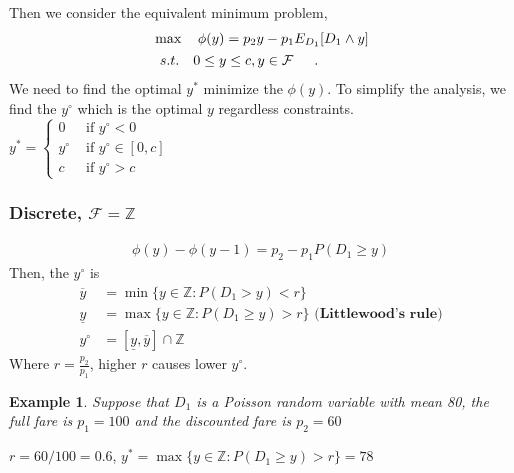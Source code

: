 \documentclass[11pt,a4paper]{article}
\newtheorem{example}{Example}
\begin{document}
Then we consider the equivalent minimum problem,
\begin{align*}
    &\max\quad \phi(y)=p_2y-p_1E_{D_1}[D_1\wedge y]\\
    &\begin{array}{r@{\quad}r@{}l@{\quad}l}
    s.t.
    &0\leq y\leq c&,y\in \mathcal{F} &\\
\end{array} .
\end{align*}
We need to find the optimal $y^*$ minimize the $\phi(y)$. To simplify the analysis, we find the $y^\circ$ which is the optimal $y$ regardless constraints. $y^*=\left\{\begin{matrix}
    0& \text{ if }y^\circ<0\\
    y^\circ&\text{ if }y^\circ\in[0,c]\\
    c&\text{ if }y^\circ>c
\end{matrix}\right.$
\subsubsection{Discrete, $\mathcal{F}=\mathbb{Z}$}
\begin{equation}
    \begin{aligned}
        \phi(y)-\phi(y-1)=p_2-p_1P(D_1\geq y)
    \end{aligned}
    \nonumber
\end{equation}
Then, the $y^\circ$ is
\begin{equation}
    \begin{aligned}
        \overline{y}&=\min\{y\in \mathbb{Z}: P(D_1>y)<r\}\\
        \underline{y}&=\max\{y\in \mathbb{Z}: P(D_1\geq y)>r\} \textbf{ (Littlewood's rule)}\\
        y^\circ&=[\underline{y},\overline{y}]\cap \mathbb{Z}
    \end{aligned}
    \nonumber
\end{equation}
Where $r=\frac{p_2}{p_1}$, higher $r$ causes lower $y^\circ$.

\begin{example}
    Suppose that $D_1$ is a Poisson random variable with mean 80, the full fare is $p_1 = 100$ and the discounted fare is $p_2 = 60$
\end{example}
$r=60/100=0.6$, $y^*=\max\{y\in \mathbb{Z}: P(D_1\geq y)>r\}=78$
\end{document}
